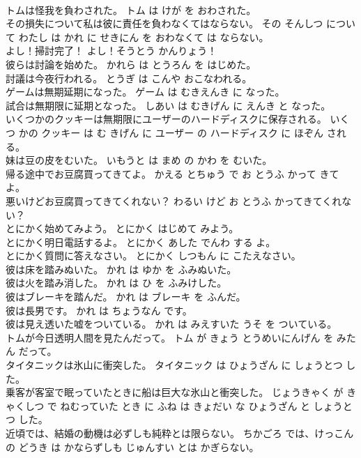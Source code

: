 \documentclass[8pt]{extreport}
\begin{document}
\begin{CJK}{UTF8}{min}
\\	トムは怪我を負わされた。	トム は けが を おわされた。	
\\	その損失について私は彼に責任を負わなくてはならない。	その そんしつ について わたし は かれ に せきにん を おわなくて は ならない。	
\\	よし！掃討完了！	よし！そうとう かんりょう！	
\\	彼らは討論を始めた。	かれら は とうろん を はじめた。	
\\	討議は今夜行われる。	とうぎ は こんや おこなわれる。	
\\	ゲームは無期延期になった。	ゲーム は むきえんき に なった。	
\\	試合は無期限に延期となった。	しあい は むきげん に えんき と なった。	
\\	いくつかのクッキーは無期限にユーザーのハードディスクに保存される。	いくつ かの クッキー は む きげん に ユーザー の ハードディスク に ほぞん される。	
\\	妹は豆の皮をむいた。	いもうと は まめ の かわ を むいた。	
\\	帰る途中でお豆腐買ってきてよ。	かえる とちゅう で お とうふ かって きて よ。	
\\	悪いけどお豆腐買ってきてくれない？	わるい けど お とうふ かってきてくれない？	
\\	とにかく始めてみよう。	とにかく はじめて みよう。	
\\	とにかく明日電話するよ。	とにかく あした でんわ する よ。	
\\	とにかく質問に答えなさい。	とにかく しつもん に こたえなさい。	
\\	彼は床を踏みぬいた。	かれ は ゆか を ふみぬいた。	
\\	彼は火を踏み消した。	かれ は ひ を ふみけした。	
\\	彼はブレーキを踏んだ。	かれ は ブレーキ を ふんだ。	
\\	彼は長男です。	かれ は ちょうなん です。	
\\	彼は見え透いた嘘をついている。	かれ は みえすいた うそ を ついている。	
\\	トムが今日透明人間を見たんだって。	トム が きょう とうめいにんげん を みた ん だって。	
\\	タイタニックは氷山に衝突した。	タイタニック は ひょうざん に しょうとつ した。	
\\	乗客が客室で眠っていたときに船は巨大な氷山と衝突した。	じょうきゃく が きゃくしつ で ねむっていた とき に ふね は きょだい な ひょうざん と しょうとつ した。	
\\	近頃では、結婚の動機は必ずしも純粋とは限らない。	ちかごろ では、けっこん の どうき は かならずしも じゅんすい とは かぎらない。	

\end{CJK}
\end{document}
